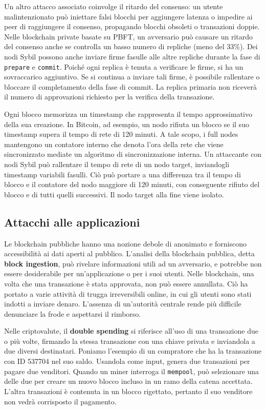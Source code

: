\vspace{5mm}

Un altro attacco associato coinvolge il ritardo del consenso: un utente malintenzionato può iniettare falsi blocchi per aggiungere latenza o impedire ai peer di raggiungere il consenso, propagando blocchi obsoleti o transazioni doppie. Nelle blockchain private basate su PBFT, un avversario può causare un ritardo del consenso anche se controlla un basso numero di repliche (meno del 33\%). Dei nodi Sybil possono anche inviare firme fasulle alle altre repliche durante la fase di \texttt{prepare} e \texttt{commit}. Poiché ogni replica è tenuta a verificare le firme, si ha un sovraccarico aggiuntivo. Se si continua a inviare tali firme, è possibile rallentare o bloccare il completamento della fase di commit. La replica primaria non riceverà il numero di approvazioni richiesto per la verifica della transazione. 

Ogni blocco memorizza un timestamp che rappresenta il tempo approssimativo della sua creazione. In Bitcoin, ad esempio, un nodo rifiuta un blocco se il suo timestamp supera il tempo di rete di 120 minuti. A tale scopo, i full nodes mantengono un contatore interno che denota l'ora della rete che viene sincronizzato mediate un algoritmo di sincronizzazione interna. Un attaccante con nodi Sybil può rallentare il tempo di rete di un nodo target, inviandogli timestamp variabili fasulli. Ciò può portare a una differenza tra il tempo di blocco e il contatore del nodo maggiore di 120 minuti, con conseguente rifiuto del blocco e di tutti quelli successivi. Il nodo target alla fine viene isolato.

\subsection{Attacchi alle applicazioni}
Le blockchain pubbliche hanno una nozione debole di anonimato e forniscono accessibilità ai dati aperti al pubblico. L'analisi della blockchain pubblica, detta \textbf{block ingestion}, può rivelare informazioni utili ad un avversario, e potrebbe non essere desiderabile per un'applicazione o per i suoi utenti. Nelle blockchain, una volta che una transazione è stata approvata, non può essere annullata. Ciò ha portato a varie attività di trugga irreversibili online, in cui gli utenti sono stati indotti a inviare denaro. L'assenza di un'autorità centrale rende più difficile denunciare la frode e aspettarsi il rimborso.

Nelle criptovalute, il \textbf{double spending} si riferisce all'uso di una transazione due o più volte, firmando la stessa transazione con una chiave privata e inviandola a due diversi destinatari. Poniamo l'esempio di un compratore che ha la transazione con ID 537704 nel suo saldo. Usandola come input, genera due transazioni per pagare due venditori. Quando un miner interroga il \texttt{mempool}, può selezionare una delle due per creare un nuovo blocco incluso in un ramo della catena accettata. L'altra transazioni è contenuta in un blocco rigettato, pertanto il suo venditore non vedrà corrisposto il pagamento.


